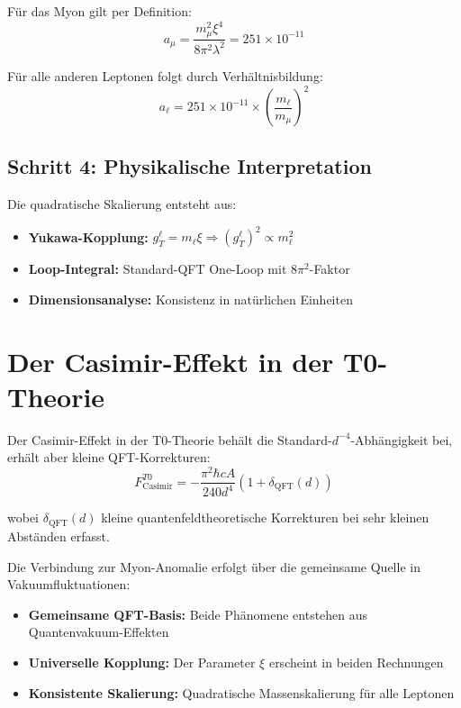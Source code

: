 \documentclass[12pt,a4paper]{article}
\begin{document}
	Für das Myon gilt per Definition:
	\begin{equation}
		a_\mu = \frac{m_\mu^2 \xi^4}{8\pi^2 \lambda^2} = 251 \times 10^{-11}
	\end{equation}
	
	Für alle anderen Leptonen folgt durch Verhältnisbildung:
	\begin{equation}
		\boxed{a_\ell = 251 \times 10^{-11} \times \left(\frac{m_\ell}{m_\mu}\right)^2}
	\end{equation}
	
	\subsection{Schritt 4: Physikalische Interpretation}
	
	Die quadratische Skalierung entsteht aus:
	\begin{itemize}
		\item \textbf{Yukawa-Kopplung:} $g_T^\ell = m_\ell \xi \Rightarrow (g_T^\ell)^2 \propto m_\ell^2$
		\item \textbf{Loop-Integral:} Standard-QFT One-Loop mit $8\pi^2$-Faktor
		\item \textbf{Dimensionsanalyse:} Konsistenz in natürlichen Einheiten
	\end{itemize}
	
	\section{Der Casimir-Effekt in der T0-Theorie}
	
	Der Casimir-Effekt in der T0-Theorie behält die Standard-$d^{-4}$-Abhängigkeit bei, erhält aber kleine QFT-Korrekturen:
	\begin{equation}
		F_{\text{Casimir}}^{T0} = -\frac{\pi^2 \hbar c A}{240 d^{4}} \left(1 + \delta_{\text{QFT}}(d)\right)
	\end{equation}
	
	wobei $\delta_{\text{QFT}}(d)$ kleine quantenfeldtheoretische Korrekturen bei sehr kleinen Abständen erfasst.
	
	Die Verbindung zur Myon-Anomalie erfolgt über die gemeinsame Quelle in Vakuumfluktuationen:
	\begin{itemize}
		\item \textbf{Gemeinsame QFT-Basis:} Beide Phänomene entstehen aus Quantenvakuum-Effekten
		\item \textbf{Universelle Kopplung:} Der Parameter $\xi$ erscheint in beiden Rechnungen
		\item \textbf{Konsistente Skalierung:} Quadratische Massenskalierung für alle Leptonen
	\end{itemize}
	
\end{document}
